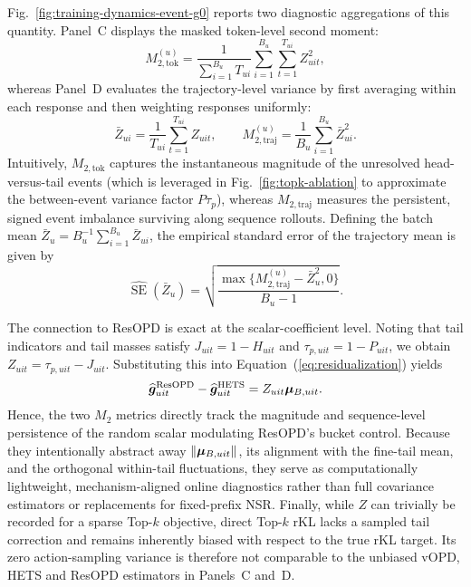 Fig.~\ref{fig:training-dynamics-event-g0} reports two diagnostic aggregations of this quantity. Panel~C displays the masked token-level second moment:
\begin{equation}
  M_{2,\mathrm{tok}}^{(u)} = \frac{1}{\sum_{i=1}^{B_u} T_{ui}} \sum_{i=1}^{B_u} \sum_{t=1}^{T_{ui}} Z_{uit}^2,
  \label{eq:online-token-m2}
\end{equation}
whereas Panel~D evaluates the trajectory-level variance by first averaging within each response and then weighting responses uniformly:
\begin{equation}
  \bar{Z}_{ui} = \frac{1}{T_{ui}} \sum_{t=1}^{T_{ui}} Z_{uit}, \qquad
  M_{2,\mathrm{traj}}^{(u)} = \frac{1}{B_u} \sum_{i=1}^{B_u} \bar{Z}_{ui}^2.
  \label{eq:online-trajectory-m2}
\end{equation}
Intuitively, $M_{2,\mathrm{tok}}$ captures the instantaneous magnitude of the unresolved head-versus-tail events (which is leveraged in Fig.~\ref{fig:topk-ablation} to approximate the between-event variance factor $P\tau_p$), whereas $M_{2,\mathrm{traj}}$ measures the persistent, signed event imbalance surviving along sequence rollouts. Defining the batch mean $\bar{Z}_u = B_u^{-1} \sum_{i=1}^{B_u} \bar{Z}_{ui}$, the empirical standard error of the trajectory mean is given by
\begin{equation}
  \widehat{\operatorname{SE}}(\bar{Z}_u) = \sqrt{\frac{\max\{M_{2,\mathrm{traj}}^{(u)} - \bar{Z}_u^2, 0\}}{B_u - 1}}.
  \label{eq:online-trajectory-se}
\end{equation}

The connection to ResOPD is exact at the scalar-coefficient level. Noting that tail indicators and tail masses satisfy $J_{uit} = 1 - H_{uit}$ and $\tau_{p,uit} = 1 - P_{uit}$, we obtain $Z_{uit} = \tau_{p,uit} - J_{uit}$. Substituting this into Equation~(\ref{eq:residualization}) yields
\begin{equation}
  \widehat{\bm{g}}_{uit}^{\mathrm{ResOPD}} - \widehat{\bm{g}}_{uit}^{\mathrm{HETS}} = Z_{uit} \bm{\mu}_{B,uit}.
  \label{eq:online-residual-cfr-link}
\end{equation}
Hence, the two $M_2$ metrics directly track the magnitude and sequence-level persistence of the random scalar modulating ResOPD's bucket control. Because they intentionally abstract away $\lVert\bm{\mu}_{B,uit}\rVert$, its alignment with the fine-tail mean, and the orthogonal within-tail fluctuations, they serve as computationally lightweight, mechanism-aligned online diagnostics rather than full covariance estimators or replacements for fixed-prefix NSR. Finally, while $Z$ can trivially be recorded for a sparse Top-$k$ objective, direct Top-$k$ rKL lacks a sampled tail correction and remains inherently biased with respect to the true rKL target. Its zero action-sampling variance is therefore not comparable to the unbiased vOPD, HETS and ResOPD estimators in Panels~C and~D.

